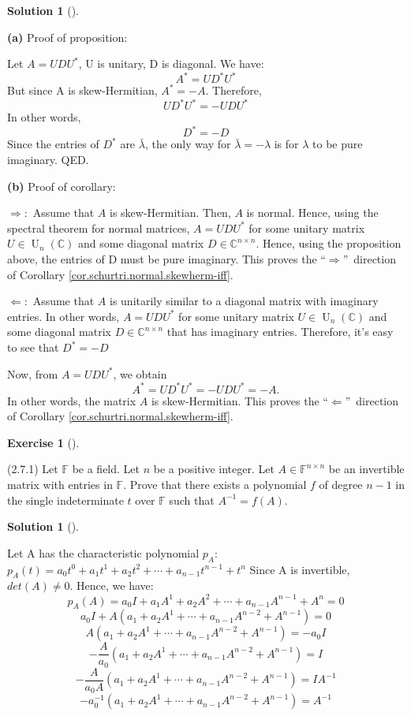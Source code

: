 \documentclass[numbers=enddot,12pt,final,onecolumn,notitlepage]{scrartcl}
\newcounter{exer}
\newcounter{sol}
\theoremstyle{definition}
\newtheorem{exmp}[exer]{Exercise}
\newenvironment{exercise}[1][]
{\begin{exmp}[#1]\begin{leftbar}}
        {\end{leftbar}\end{exmp}}
\newtheorem{solu}[sol]{Solution}
\newenvironment{solution}[1][]
{\begin{solu}[#1]\begin{leftbar}}
        {\end{leftbar}\end{solu}}
\begin{document}
\begin{solution}
	\textbf{(a)} Proof of proposition:

	Let $A = UDU^{\ast}$, U is unitary, D is diagonal. We have:
	\[
		A^{\ast} = UD^{\ast}U^{\ast}
	\]
	But since A is skew-Hermitian, $A^{\ast} = -A$. Therefore,
	\[
		UD^{\ast}U^{\ast} = -UDU^{\ast}
	\]
	In other words,
	\[
		D^{\ast} = -D
	\]
	Since the entries of $D^{\ast}$ are $\bar{\lambda}$, the only way for $\bar{\lambda} = -\lambda$ is for $\lambda$ to be pure imaginary. QED.

	\textbf{(b)} Proof of corollary:

	$\Longrightarrow:$ Assume that $A$ is skew-Hermitian. Then, $A$ is normal. Hence, using the spectral theorem for normal matrices, $A=UDU^{\ast}$ for some unitary matrix $U\in\operatorname*{U}\nolimits_{n}\left(  \mathbb{C}\right)  $ and
	some diagonal matrix $D\in\mathbb{C}^{n\times n}$. Hence, using the proposition above, the entries of D must be pure imaginary. This proves the \textquotedblleft$\Longrightarrow$\textquotedblright\ direction of Corollary
	\ref{cor.schurtri.normal.skewherm-iff}. \medskip

	$\Longleftarrow:$ Assume that $A$ is unitarily similar to a diagonal matrix	with imaginary entries. In other words, $A=UDU^{\ast}$ for some unitary matrix	$U\in\operatorname*{U}\nolimits_{n}\left(  \mathbb{C}\right)  $ and some
	diagonal matrix $D\in\mathbb{C}^{n\times n}$ that has imaginary entries. Therefore, it's easy to see that $D^{\ast} = -D$

	Now, from $A=UDU^{\ast}$, we obtain
	\[
		A^{\ast}=UD^{\ast}U^{\ast}=-UDU^{\ast} = -A.
	\]
	In other words, the matrix $A$ is skew-Hermitian. This proves the \textquotedblleft $\Longleftarrow$\textquotedblright\ direction of Corollary \ref{cor.schurtri.normal.skewherm-iff}.

\end{solution}

\begin{exercise}
	\label{exe.schurtri.ch.inverse-poly} (2.7.1) Let $\mathbb{F}$ be a field. Let
	$n$ be a positive integer. Let $A\in\mathbb{F}^{n\times n}$ be an invertible
	matrix with entries in $\mathbb{F}$. Prove that there exists a polynomial $f$
	of degree $n-1$ in the single indeterminate $t$ over $\mathbb{F}$ such that
	$A^{-1}=f\left(  A\right)  $.
\end{exercise}

\begin{solution}
	Let A has the characteristic polynomial $p_A$: $p_A(t) = a_0t^0 + a_1t^1 + a_2t^2 + \cdots + a_{n-1}t^{n-1} + t^n$ Since A is invertible, $det(A) \neq 0$. Hence, we have:
	\[
		p_A(A) = a_0I + a_1A^1 + a_2A^2 + \cdots + a_{n-1}A^{n-1} + A^n = 0
	\]
	\[
		a_0I + A(a_1 + a_2A^1 + \cdots + a_{n-1}A^{n-2} + A^{n-1}) = 0
	\]
	\[
		A(a_1 + a_2A^1 + \cdots + a_{n-1}A^{n-2} + A^{n-1}) = -a_0I
	\]
	\[
		-\frac{A}{a_0}(a_1 + a_2A^1 + \cdots + a_{n-1}A^{n-2} + A^{n-1}) = I
	\]
	\[
		-\frac{A}{a_0A}(a_1 + a_2A^1 + \cdots + a_{n-1}A^{n-2} + A^{n-1}) = IA^{-1}
	\]
	\[
		-a_0^{-1}(a_1 + a_2A^1 + \cdots + a_{n-1}A^{n-2} + A^{n-1}) = A^{-1}
	\]

\end{solution}
\end{document}
